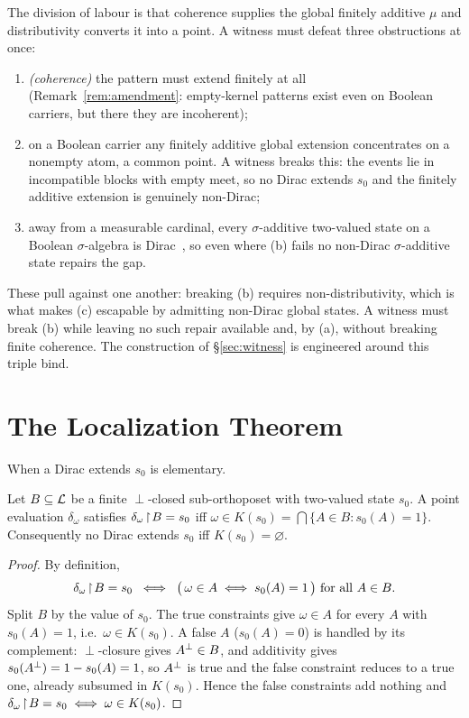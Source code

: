 The division of labour is that coherence supplies the global finitely additive
$\mu$ and distributivity converts it into a point. A witness must defeat three
obstructions at once:
\begin{enumerate}[label=\textup{(\alph*)}]
  \item \emph{(coherence)} the pattern must extend finitely at all
    (Remark~\ref{rem:amendment}: empty-kernel patterns exist even on Boolean
    carriers, but there they are incoherent);
  \item on a Boolean carrier any finitely additive global extension concentrates
    on a nonempty atom, a common point. A witness breaks this: the events lie in
    incompatible blocks with empty meet, so no Dirac extends $s_0$ and the
    finitely additive extension is genuinely non-Dirac;
  \item away from a measurable cardinal, every $\sigma$-additive two-valued state
    on a Boolean $\sigma$-algebra is Dirac~\cite{Sikorski1964,Jech2003}, so even
    where (b) fails no non-Dirac $\sigma$-additive state repairs the gap.
\end{enumerate}
These pull against one another: breaking (b) requires non-distributivity, which
is what makes (c) escapable by admitting non-Dirac global states. A witness must
break (b) while leaving no such repair available and, by (a), without breaking
finite coherence. The construction of \S\ref{sec:witness} is engineered around
this triple bind.


\section{The Localization Theorem}\label{sec:localization}

When a Dirac extends $s_0$ is elementary.

\begin{lemma}\label{lem:dirac-iff}
Let $B \subseteq \mathcal{L}$ be a finite $\perp$-closed sub-orthoposet with two-valued
state $s_0$. A point evaluation $\delta_\omega$ satisfies $\delta_\omega\!\restriction\! B
= s_0$ iff $\omega \in K(s_0) = \bigcap\{A \in B : s_0(A) = 1\}$. Consequently no
Dirac extends $s_0$ iff $K(s_0) = \varnothing$.
\end{lemma}

\begin{proof}
By definition,
\[
  \delta_\omega\!\restriction\! B = s_0
  \;\iff\;
  \bigl(\,\omega \in A \iff s_0(A)=1\,\bigr) \text{ for all } A \in B .
\]
Split $B$ by the value of $s_0$. The true constraints give $\omega \in A$ for every
$A$ with $s_0(A)=1$, i.e.\ $\omega \in K(s_0)$. A false $A$ ($s_0(A)=0$) is handled by
its complement: $\perp$-closure gives $A{}^{\perp} \in B$, and additivity gives
$s_0(A{}^{\perp}) = 1 - s_0(A) = 1$, so $A{}^{\perp}$ is true and the false constraint reduces
to a true one, already subsumed in $K(s_0)$. Hence the false constraints add nothing
and $\delta_\omega\!\restriction\! B = s_0 \iff \omega \in K(s_0)$.
\end{proof}

